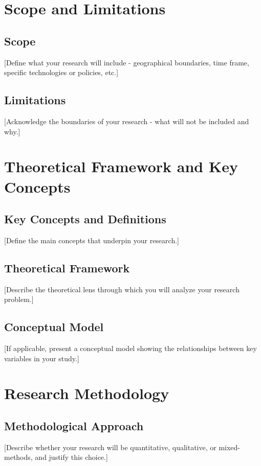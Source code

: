 \documentclass[12pt,a4paper]{article}
\begin{document}
\section{Scope and Limitations}
\label{sec:scope}

\subsection{Scope}
[Define what your research will include - geographical boundaries, time frame, specific technologies or policies, etc.]

\subsection{Limitations}
[Acknowledge the boundaries of your research - what will not be included and why.]

\section{Theoretical Framework and Key Concepts}
\label{sec:theory}

\subsection{Key Concepts and Definitions}
[Define the main concepts that underpin your research.]

\subsection{Theoretical Framework}
[Describe the theoretical lens through which you will analyze your research problem.]

\subsection{Conceptual Model}
[If applicable, present a conceptual model showing the relationships between key variables in your study.]

\section{Research Methodology}
\label{sec:methodology}

\subsection{Methodological Approach}
[Describe whether your research will be quantitative, qualitative, or mixed-methods, and justify this choice.]
\end{document}
